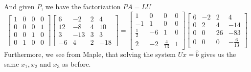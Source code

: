 \documentclass[12pt]{article}
\begin{document}
And given $P$, we have the factorization $PA=LU$
$$
\begin{bmatrix}
1 & 0 & 0 & 0\\
0 & 0 & 0 & 1 \\
0 & 0 & 1 & 0 \\
0 & 1 & 0 & 0
\end{bmatrix}
\begin{bmatrix}
6 & -2 & 2 & 4\\
12 & -8 & 4 & 10 \\
3 & -13 & 3 & 3 \\
-6 & 4 & 2 & -18
\end{bmatrix}
=
\begin{bmatrix}
1 & 0 & 0 & 0\\
-1 & 1 & 0 & 0 \\
\frac{1}{2} & -6 & 1 & 0 \\
2 & -2 & \frac{4}{13} & 1
\end{bmatrix}
\begin{bmatrix}
6 & -2 & 2 & 4\\
0 & 2 & 4 & -14 \\
0 & 0 & 26 & -83 \\
0 & 0 & 0 & -\frac{6}{13}
\end{bmatrix}
$$
Furthermore, we see from Maple, that solving the system $Ux=\hat{b}$ gives us the same $x_1,x_2$ and $x_3$ as before.
\end{document}

